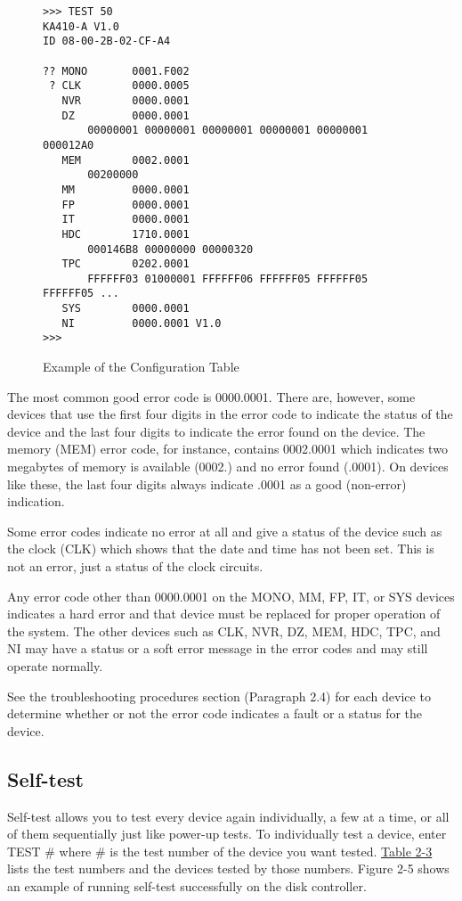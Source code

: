 \begin{figure}[H]
\caption{Example of the Configuration Table}
\begin{verbatim}
>>> TEST 50
KA410-A V1.0
ID 08-00-2B-02-CF-A4

?? MONO       0001.F002
 ? CLK        0000.0005
   NVR        0000.0001
   DZ         0000.0001
       00000001 00000001 00000001 00000001 00000001 000012A0
   MEM        0002.0001
       00200000
   MM         0000.0001
   FP         0000.0001
   IT         0000.0001
   HDC        1710.0001
       000146B8 00000000 00000320
   TPC        0202.0001
       FFFFFF03 01000001 FFFFFF06 FFFFFF05 FFFFFF05 FFFFFF05 ...
   SYS        0000.0001
   NI         0000.0001 V1.0
>>>
\end{verbatim}
\end{figure}
\label{figure:2-3}

The most common good error code is 0000.0001. There are, however, some
devices that use the first four digits in the error code to indicate the status
of the device and the last four digits to indicate the error found on the
device. The memory (MEM) error code, for instance, contains 0002.0001
which indicates two megabytes of memory is available (0002.) and no error
found (.0001). On devices like these, the last four digits always indicate
.0001 as a good (non-error) indication.

Some error codes indicate no error at all and give a status of the device
such as the clock (CLK) which shows that the date and time has not been
set. This is not an error, just a status of the clock circuits.

Any error code other than 0000.0001 on the MONO, MM, FP, IT, or SYS
devices indicates a hard error and that device must be replaced for proper
operation of the system. The other devices such as CLK, NVR, DZ, MEM,
HDC, TPC, and NI may have a status or a soft error message in the error
codes and may still operate normally.

See the troubleshooting procedures section (Paragraph 2.4) for each device
to determine whether or not the error code indicates a fault or a status for
the device.

\subsection{Self-test}

Self-test allows you to test every device again individually, a few at a time,
or all of them sequentially just like power-up tests. To individually test a
device, enter TEST \# where \# is the test number of the device you want
tested. \hyperref[table:2-3]{Table 2-3} lists the test numbers and the devices tested by those
numbers. Figure 2-5 shows an example of running self-test successfully on
the disk controller.

